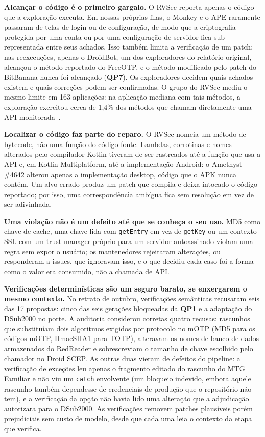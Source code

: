 \documentclass[conference]{IEEEtran}
\newcommand{\researchq}[1]{\textbf{QP#1}}
\begin{document}
\textbf{Alcançar o código é o primeiro gargalo.} O RVSec reporta apenas o código
que a exploração executa. Em nossas próprias filas, o Monkey e o APE raramente
passaram de telas de login ou de configuração, de modo que a criptografia protegida
por uma conta ou por uma configuração de servidor fica sub-representada entre seus
achados. Isso também limita a verificação de um patch: nas reexecuções, apenas o
DroidBot, um dos exploradores do relatório original, alcançou o método reportado do FreeOTP, e o método
modificado pelo patch do BitBanana nunca foi alcançado (\researchq{7}). Os exploradores decidem quais achados existem e quais
correções podem ser confirmadas. O grupo do RVSec mediu o mesmo limite em 163
aplicações: na aplicação mediana com tais métodos, a exploração exercitou cerca de
1,4\% dos métodos que chamam diretamente uma API monitorada~\cite{costa2026effectiveness}.

\textbf{Localizar o código faz parte do reparo.} O RVSec nomeia um método de
bytecode, não uma função do código-fonte. Lambdas, corrotinas e nomes alterados
pelo compilador Kotlin tiveram de ser rastreados até a função que usa a API e,
em Kotlin Multiplatform, até a implementação Android: o Amethyst \#4642 alterou
apenas a implementação desktop, código que o APK nunca contém. Um alvo errado
produz um patch que compila e deixa intocado o código reportado; por isso, uma
correspondência ambígua fica sem resolução em vez de ser adivinhada.

\textbf{Uma violação não é um defeito até que se conheça o seu uso.} MD5 como chave
de cache, uma chave lida com \texttt{getEntry} em vez de \texttt{getKey} ou um contexto
SSL com um trust manager próprio para um servidor autoassinado violam uma regra sem
expor o usuário; os mantenedores rejeitaram alterações, ou responderam a issues, que
ignoravam isso, e o que decidiu cada caso foi
a forma como o valor era consumido, não a chamada de API.

\textbf{Verificações determinísticas são um seguro barato, se enxergarem o mesmo contexto.}
No retrato de outubro, verificações semânticas recusaram seis das 17 propostas: cinco
das seis gerações bloqueadas da \researchq{1} e a adaptação do DSub2000 no porte. A
auditoria considerou corretas quatro recusas: rascunhos que substituíam dois
algoritmos exigidos por protocolo no mOTP (MD5 para os códigos mOTP, HmacSHA1
para TOTP), alteravam os nomes de banco de dados armazenados
do RedReader e sobrescreviam o tamanho de chave escolhido pelo chamador no Droid
SCEP. As outras duas vieram de defeitos do pipeline: a verificação de exceções leu
apenas o fragmento editado do rascunho do MTG Familiar e não viu um \texttt{catch}
envolvente (um bloqueio indevido, embora aquele rascunho também dependesse
de credenciais de produção que o repositório não tem), e a verificação da opção não havia lido uma alteração que a
adjudicação autorizara para o DSub2000.
As verificações removem patches plausíveis porém prejudiciais sem custo de modelo, desde que cada uma
leia o contexto da etapa que verifica.
\end{document}
